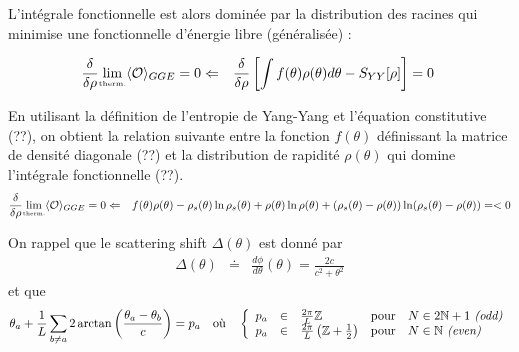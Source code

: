 	L'intégrale fonctionnelle est alors dominée par la distribution des racines qui minimise une fonctionnelle d'énergie libre (généralisée) :
	
	\begin{eqnarray}
		\frac{\delta}{\delta \rho}	\underset{\mbox{\tiny therm.}}{\lim} \langle \mathcal{O}\rangle_{GGE} = 0 & \Leftarrow & \frac{\delta}{\delta \rho} \left [ \int  f(\theta) \rho(\theta )  d\theta - S_{YY} [\rho] \right ] = 0  
	\end{eqnarray}
	
	En utilisant la définition de l'entropie de Yang-Yang et l'équation constitutive (??), on obtient la relation suivante entre la fonction $f(\theta)$ définissant la matrice de densité diagonale (??) et la distribution de rapidité $\rho (\theta)$ qui domine l'intégrale fonctionnelle (??).\\
	
	\begin{eqnarray}
		\frac{\delta}{\delta \rho}	\underset{\mbox{\tiny therm.}}{\lim} \langle \mathcal{O}\rangle_{GGE} = 0 & \Leftarrow &   	f(\theta) \rho(\theta )  -  \rho_s (\theta ) \ln \rho_s ( \theta ) +  \rho (\theta ) \ln \rho ( \theta ) + ( \rho_s (\theta ) - \rho ( \theta ) )  \ln   ( \rho_s ( \theta ) - \rho ( \theta ) ) = <0	
	\end{eqnarray}

	
	On rappel que le scattering shift $\Delta(\theta ) $ est donné par
	\begin{eqnarray*}
		\Delta( \theta ) & \doteq & \frac{d \phi }{d \theta } ( \theta ) = \frac{ 2c} { c^2 + \theta^2}	
	\end{eqnarray*}
	et que 
	\begin{eqnarray}
		\theta_a + \frac{1}{L} \sum_{b \neq a} 2 \arctan \left( \frac{\theta_a - \theta_b }{c} \right ) = p_a \quad \mbox{où}\quad \left \{\begin{array}{rclll} p_a & \in & \frac{2\pi}{L} \mathbb{Z} & \mbox{pour} & N \in 2\mathbb{N} + 1 ~\mbox{\em (odd)} \\ p_a & \in & \frac{2\pi}{L} \left ( \mathbb{Z}+ \frac{1}{2} \right ) & \mbox{pour} & N \in \mathbb{N} ~\mbox{\em(even)} \end{array} \right. 	
	\end{eqnarray}
	
